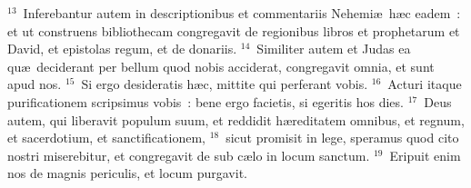 ${}^{13}$~Inferebantur autem in descriptionibus et commentariis Nehemi\ae\ h\ae c eadem~: et ut construens bibliothecam congregavit de regionibus libros et prophetarum et David, et epistolas regum, et de donariis.
${}^{14}$~Similiter autem et Judas ea qu\ae\ deciderant per bellum quod nobis acciderat, congregavit omnia, et sunt apud nos.
${}^{15}$~Si ergo desideratis h\ae c, mittite qui perferant vobis.
${}^{16}$~Acturi itaque purificationem scripsimus vobis~: bene ergo facietis, si egeritis hos dies.
${}^{17}$~Deus autem, qui liberavit populum suum, et reddidit h\ae reditatem omnibus, et regnum, et sacerdotium, et sanctificationem,
${}^{18}$~sicut promisit in lege, speramus quod cito nostri miserebitur, et congregavit de sub c\ae lo in locum sanctum.
${}^{19}$~Eripuit enim nos de magnis periculis, et locum purgavit.


